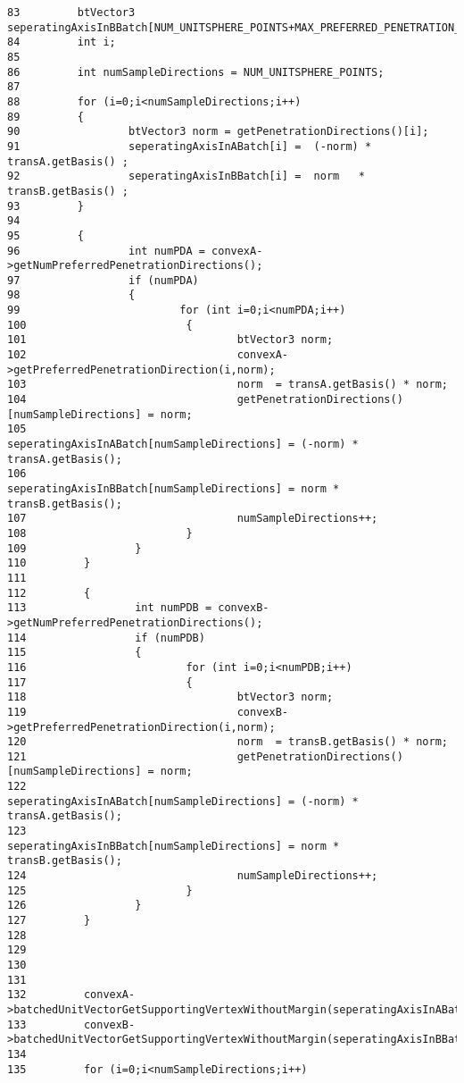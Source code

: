 \begin{Code}
\begin{verbatim}
83         btVector3       seperatingAxisInBBatch[NUM_UNITSPHERE_POINTS+MAX_PREFERRED_PENETRATION_DIRECTIONS*2];
84         int i;
85 
86         int numSampleDirections = NUM_UNITSPHERE_POINTS;
87 
88         for (i=0;i<numSampleDirections;i++)
89         {
90                 btVector3 norm = getPenetrationDirections()[i];
91                 seperatingAxisInABatch[i] =  (-norm) * transA.getBasis() ;
92                 seperatingAxisInBBatch[i] =  norm   * transB.getBasis() ;
93         }
94 
95         {
96                 int numPDA = convexA->getNumPreferredPenetrationDirections();
97                 if (numPDA)
98                 {
99                         for (int i=0;i<numPDA;i++)
100                         {
101                                 btVector3 norm;
102                                 convexA->getPreferredPenetrationDirection(i,norm);
103                                 norm  = transA.getBasis() * norm;
104                                 getPenetrationDirections()[numSampleDirections] = norm;
105                                 seperatingAxisInABatch[numSampleDirections] = (-norm) * transA.getBasis();
106                                 seperatingAxisInBBatch[numSampleDirections] = norm * transB.getBasis();
107                                 numSampleDirections++;
108                         }
109                 }
110         }
111 
112         {
113                 int numPDB = convexB->getNumPreferredPenetrationDirections();
114                 if (numPDB)
115                 {
116                         for (int i=0;i<numPDB;i++)
117                         {
118                                 btVector3 norm;
119                                 convexB->getPreferredPenetrationDirection(i,norm);
120                                 norm  = transB.getBasis() * norm;
121                                 getPenetrationDirections()[numSampleDirections] = norm;
122                                 seperatingAxisInABatch[numSampleDirections] = (-norm) * transA.getBasis();
123                                 seperatingAxisInBBatch[numSampleDirections] = norm * transB.getBasis();
124                                 numSampleDirections++;
125                         }
126                 }
127         }
128 
129 
130 
131 
132         convexA->batchedUnitVectorGetSupportingVertexWithoutMargin(seperatingAxisInABatch,supportVerticesABatch,numSampleDirections);
133         convexB->batchedUnitVectorGetSupportingVertexWithoutMargin(seperatingAxisInBBatch,supportVerticesBBatch,numSampleDirections);
134 
135         for (i=0;i<numSampleDirections;i++)

\end{verbatim}
\end{Code}
